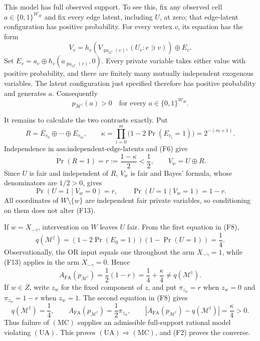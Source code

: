 This model has full observed support.  To see this, fix any observed cell \(a\in\{0,1\}^{\mathcal W_H}\) and fix every edge latent, including \(U\), at zero; that edge-latent configuration has positive probability.  For every vertex \(v\), its equation has the form
\[
V_v=h_v(V_{\operatorname{pa}_{G^{\dagger}}(v)},(U_e:e\ni v))\mathbin\oplus E_v.
\tag{F9}
\]
Set \(E_v=a_v\mathbin\oplus h_v(a_{\operatorname{pa}_{G^{\dagger}}(v)},0)\).  Every private variable takes either value with positive probability, and there are finitely many mutually independent exogenous variables.  The latent configuration just specified therefore has positive probability and generates \(a\).  Consequently
\[
p_{\mathcal M^{\dagger}}(a)>0
\quad\text{for every }a\in\{0,1\}^{\mathcal W_H}.
\tag{F10}
\]

It remains to calculate the two contrasts exactly.  Put
\[
R=E_{v_0}\mathbin\oplus\cdots\mathbin\oplus E_{v_m},
\qquad
\kappa=\prod_{i=0}^{m}\bigl(1-2\Pr(E_{v_i}=1)\bigr)=2^{-(m+1)}.
\tag{F11}
\]
Independence in \(\text{ass:independent-edge-latents}\) and (F6) give
\[
\Pr(R=1)=r:=\frac{1-\kappa}{2}<\frac12,
\qquad
V_w=U\mathbin\oplus R.
\tag{F12}
\]
Since \(U\) is fair and independent of \(R\), \(V_w\) is fair and Bayes' formula, whose denominators are \(1/2>0\), gives
\[
\Pr(U=1\mid V_w=0)=r,
\qquad
\Pr(U=1\mid V_w=1)=1-r.
\tag{F13}
\]
All coordinates of \(W\setminus\{w\}\) are independent fair private variables, so conditioning on them does not alter (F13).

If \(w=X_{-\gamma}\), intervention on \(W\) leaves \(U\) fair.  From the first equation in (F8),
\[
q(\mathcal M^{\dagger})
=\left(1-2\Pr(E_0=1)\right)\left(1-\Pr(U=1)\right)
=\frac14.
\tag{F14}
\]
Observationally, the OR input equals one throughout the arm \(X_{-\gamma}=1\), while (F13) applies in the arm \(X_{-\gamma}=0\).  Hence
\[
A_{\mathrm{FA}}(p_{\mathcal M^{\dagger}})
=\frac12(1-r)
=\frac14+\frac{\kappa}{4}
\ne q(\mathcal M^{\dagger}).
\tag{F15}
\]
If \(w\in Z\), write \(z_w\) for the fixed component of \(z\), and put \(\pi_{z_w}=r\) when \(z_w=0\) and \(\pi_{z_w}=1-r\) when \(z_w=1\).  The second equation in (F8) gives
\[
q(\mathcal M^{\dagger})=\frac14,
\qquad
A_{\mathrm{FA}}(p_{\mathcal M^{\dagger}})=\frac12\pi_{z_w},
\qquad
\left|A_{\mathrm{FA}}(p_{\mathcal M^{\dagger}})-q(\mathcal M^{\dagger})\right|=\frac{\kappa}{4}>0.
\tag{F16}
\]
Thus failure of \(\mathrm{(MC)}\) supplies an admissible full-support rational model violating \(\mathrm{(UA)}\).  This proves \(\mathrm{(UA)}\Rightarrow\mathrm{(MC)}\), and (F2) proves the converse.

